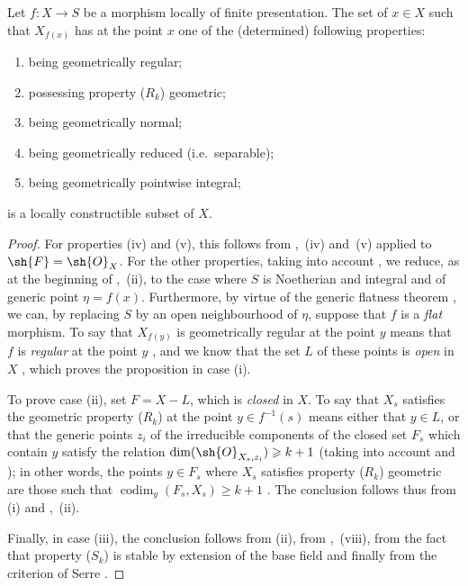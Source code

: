 \begin{proposition}[9.9.4]
\label{IV.9.9.4}
Let $f:X\to S$ be a morphism locally of finite presentation.
The set of $x\in X$ such that $X_{f(x)}$ has at the point $x$ one of the (determined) following properties:
\begin{enumerate}[label=(\roman*)]
  \item being geometrically regular;
  \item possessing property ($R_k$) geometric;
  \item being geometrically normal;
  \item being geometrically reduced (i.e.\ separable);
  \item being geometrically pointwise integral;
\end{enumerate}
is a locally constructible subset of $X$.
\end{proposition}

\begin{proof}
\label{IV.9.9.4-proof}
For properties (iv) and (v), this follows from ,~(iv) and~(v) applied to $\sh{F}=\sh{O}_X$.
For the other properties, taking into account , we reduce, as at the beginning of ,~(ii), to the case where $S$ is Noetherian and integral and of generic point $\eta=f(x)$.
Furthermore, by virtue of the generic flatness theorem , we can, by replacing $S$ by an open neighbourhood of $\eta$, suppose that $f$ is a \emph{flat} morphism.
To say that $X_{f(y)}$ is geometrically regular at the point $y$ means that $f$ is \emph{regular} at the point $y$ , and we know that the set $L$ of these points is \emph{open} in $X$ , which proves the proposition in case (i).

To prove case (ii), set $F=X-L$, which is \emph{closed} in $X$.
To say that $X_s$
satisfies the geometric property ($R_k$) at the point $y\in f^{-1}(s)$ means either that $y\in L$, or that the generic points $z_i$ of the irreducible components of the closed set $F_s$ which contain $y$ satisfy the relation $\dim(\sh{O}_{X_s,z_i})\geqslant k+1$ (taking into account  and ); in other words, the points $y\in F_s$ where $X_s$ satisfies property ($R_k$) geometric are those such that $\operatorname{codim}_y(F_s,X_s)\geqslant k+1$ .
The conclusion follows thus from (i) and ,~(ii).

Finally, in case (iii), the conclusion follows from (ii), from ,~(viii), from the fact that property ($S_k$) is stable by extension of the base field  and finally from the criterion of Serre .
\end{proof}


